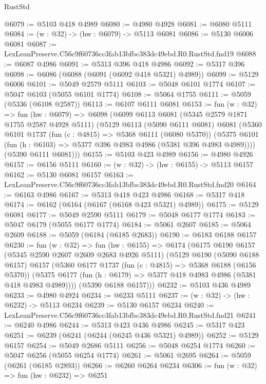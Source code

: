 \begin{lexlean}{RustStd}
\begin{coremodule}
@6079 := @5103 @418 @4989
@6080 := @4980 @4928
@6081 := @6080 @5111
@6084 := (w : @32) -> (hw : @6079) -> @5113 @6081
@6086 := @5130 @6006 @6081
@6087 := LexLeanPreserve.C56c9f60736cc3fab13bfbc383dc49ebd.R0.RustStd.fnd19
@6088 := @6087 @4986
@6091 := @5313 @396 @418 @4986
@6092 := @5317 @396
@6098 := @6086 (@6088 (@6091 (@6092 @418 @5321) @4989))
@6099 := @5129 @6006
@6101 := @5049 @2579 @5111
@6103 := @5048 @6101 @1774
@6107 := @5047 @6103 (@5055 @6101 @1774)
@6108 := @5064 @1755
@6111 := @5059 (@5336 (@6108 @2587))
@6113 := @6107 @6111 @6081
@6153 := fun (w : @32) =>
  fun (hw : @6079) =>
  @6098
    (@6099
      @6113
      @6081
      (@5345 @2579 @1871 @1755 @2587 @4928 @5111)
      (@5129
        @6113
        (@5090 @6111 @6081)
        @6081
        (@5360
          @6101
          @1737
          (fun (c : @4815) => @5368 @6111 (@6080 @5370))
          (@5375 @6101 (fun (h : @6103) => @5377 @396 @4983 @4986 (@5381 @396 @4983 @4989))))
        (@5390 @6111 @6081)))
@6155 := @5103 @423 @4989
@6156 := @4980 @4926
@6157 := @6156 @5111
@6160 := (w : @32) -> (hw : @6155) -> @5113 @6157
@6162 := @5130 @6081 @6157
@6163 := LexLeanPreserve.C56c9f60736cc3fab13bfbc383dc49ebd.R0.RustStd.fnd20
@6164 := @6163 @4986
@6167 := @5313 @418 @423 @4986
@6168 := @5317 @418
@6174 := @6162 (@6164 (@6167 (@6168 @423 @5321) @4989))
@6175 := @5129 @6081
@6177 := @5049 @2590 @5111
@6179 := @5048 @6177 @1774
@6183 := @5047 @6179 (@5055 @6177 @1774)
@6184 := @5061 @2607
@6185 := @5064 @2609
@6188 := @5059 (@6184 (@6185 @2683))
@6190 := @6183 @6188 @6157
@6230 := fun (w : @32) =>
  fun (hw : @6155) =>
  @6174
    (@6175
      @6190
      @6157
      (@5345 @2590 @2607 @2609 @2683 @4926 @5111)
      (@5129
        @6190
        (@5090 @6188 @6157)
        @6157
        (@5360
          @6177
          @1737
          (fun (c : @4815) => @5368 @6188 (@6156 @5370))
          (@5375 @6177 (fun (h : @6179) => @5377 @418 @4983 @4986 (@5381 @418 @4983 @4989))))
        (@5390 @6188 @6157)))
@6232 := @5103 @436 @4989
@6233 := @4980 @4924
@6234 := @6233 @5111
@6237 := (w : @32) -> (hw : @6232) -> @5113 @6234
@6239 := @5130 @6157 @6234
@6240 := LexLeanPreserve.C56c9f60736cc3fab13bfbc383dc49ebd.R0.RustStd.fnd21
@6241 := @6240 @4986
@6244 := @5313 @423 @436 @4986
@6245 := @5317 @423
@6251 := @6239 (@6241 (@6244 (@6245 @436 @5321) @4989))
@6252 := @5129 @6157
@6254 := @5049 @2686 @5111
@6256 := @5048 @6254 @1774
@6260 := @5047 @6256 (@5055 @6254 @1774)
@6261 := @5061 @2695
@6264 := @5059 (@6261 (@6185 @2893))
@6266 := @6260 @6264 @6234
@6306 := fun (w : @32) =>
  fun (hw : @6232) =>
  @6251

\end{coremodule}
\end{lexlean}
